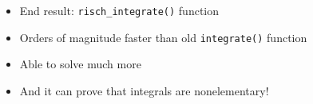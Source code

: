 \documentclass{beamer}
\numberwithin{equation}{section} %
\newcommand{\rischintegrate}{\texttt{risch\_integrate()}}
\begin{document}
\begin{frame}
    \begin{itemize}
        \item End result: \rischintegrate{} function
        \item Orders of magnitude faster than old \texttt{integrate()} function
        \item Able to solve much more
        \item And it can prove that integrals are nonelementary!
    \end{itemize}
\end{frame}

\begin{frame}
    \begin{figure}[t!]
    \end{figure}
\end{frame}

\begin{frame}
    \begin{figure}
    \begin{flushleft}
    \end{flushleft}
    \end{figure}
\end{frame}

\begin{frame}
    \begin{figure}
    \begin{flushleft}
    \end{flushleft}
    \end{figure}
\end{frame}
\end{document}
